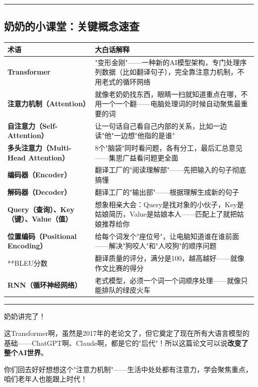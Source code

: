\documentclass[11pt,a4paper]{article}
\begin{document}
\vspace{0.5em}\noindent\rule{\textwidth}{0.4pt}\vspace{0.5em}

\subsection*{奶奶的小课堂：关键概念速查}

\begin{center}
\begin{tabular}{|l|l|}
\hline
术语 & 大白话解释 \\
\hline
\textbf{Transformer} & "变形金刚"——一种新的AI模型架构，专门处理序列数据（比如翻译句子），完全靠注意力机制，不用老式的循环网络 \\
\hline
\textbf{注意力机制（Attention）} & 就像老奶奶找东西，眼睛一扫就知道重点在哪，不用一个一个翻——电脑处理词的时候自动聚焦最重要的词 \\
\hline
\textbf{自注意力（Self-Attention）} & 让一句话自己看自己内部的关系，比如一边读"他"一边想"他指的是谁" \\
\hline
\textbf{多头注意力（Multi-Head Attention）} & 8个"脑袋"同时看问题，各有分工，最后汇总意见——集思广益看问题更全面 \\
\hline
\textbf{编码器（Encoder）} & 翻译工厂的"阅读理解部"——先把输入的句子彻底搞懂 \\
\hline
\textbf{解码器（Decoder）} & 翻译工厂的"输出部"——根据理解生成新的句子 \\
\hline
\textbf{Query（查询）、Key（键）、Value（值）} & 想象相亲大会：Query是找对象的小伙子，Key是姑娘简历，Value是姑娘本人——匹配上了就把姑娘推荐给你 \\
\hline
\textbf{位置编码（Positional Encoding）} & 给每个词发个"座位号"，让电脑知道谁在谁前面——解决"狗咬人"和"人咬狗"的顺序问题 \\
\hline
**BLEU分数 & 翻译质量的评分，满分是100，越高越好——就像作文比赛的得分 \\
\hline
\textbf{RNN（循环神经网络）} & 老式模型，必须一个词一个词顺序处理——就像只能排队的绿皮火车 \\
\hline
\end{tabular}
\end{center}

\vspace{0.5em}\noindent\rule{\textwidth}{0.4pt}\vspace{0.5em}

奶奶讲完了！👵✨

这Transformer啊，虽然是2017年的老论文了，但它奠定了现在所有大语言模型的基础——ChatGPT啊、Claude啊，都是它的"后代"！所以这篇论文可以说\textbf{改变了整个AI世界}。

你们回去好好想想这个"注意力机制"——生活中处处都有注意力，学会聚焦重点，咱们老年人也能跟上时代！
\end{document}
